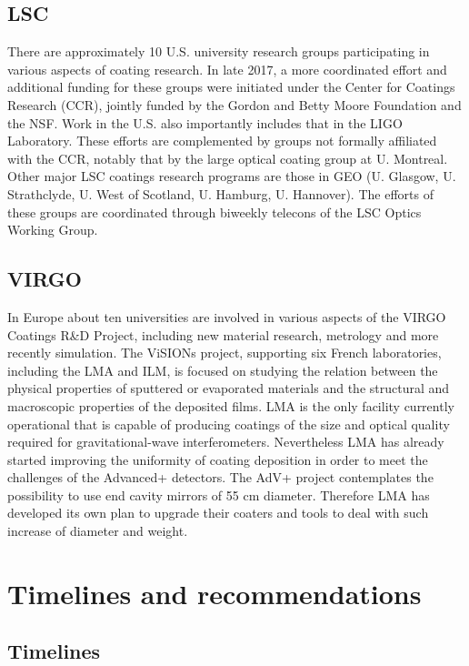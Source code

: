 \subsection{LSC}

There are approximately 10 U.S. university research groups participating in various aspects of coating research. In late 2017, a more coordinated effort and additional funding for these groups were initiated under the Center for Coatings Research (CCR), jointly funded by the Gordon and Betty Moore Foundation and the NSF. Work in the U.S. also importantly includes that in the LIGO Laboratory. These efforts are complemented by groups not formally affiliated with the CCR, notably that by the large optical coating group at U. Montreal. Other major LSC coatings research programs are those in GEO (U. Glasgow, U. Strathclyde, U. West of Scotland, U. Hamburg, U. Hannover). The efforts of these groups are coordinated through biweekly telecons of the LSC Optics Working Group.

\subsection{VIRGO}

In Europe about ten universities are involved in various aspects of the VIRGO Coatings R\&D Project, including new material research, metrology and more recently simulation. The ViSIONs project, supporting six French laboratories, including the LMA and ILM, is focused on studying the relation between the physical properties of sputtered or evaporated materials and the structural and macroscopic properties of the deposited films. LMA is the only facility currently operational that is capable of producing coatings of the size and optical quality required for gravitational-wave interferometers. Nevertheless LMA has already started improving the uniformity of coating deposition in order to meet the challenges of the Advanced+ detectors. The AdV+ project contemplates the possibility to use end cavity mirrors of 55 cm diameter. Therefore LMA has developed its own plan to upgrade their coaters and tools to deal with such increase of diameter and weight.

\section{Timelines and recommendations}
\label{coatings_Recomm}
\subsection{Timelines}

